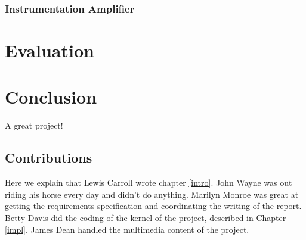 \documentclass{l3proj}
\begin{document}
\subsection{Instrumentation Amplifier}
\label{ina}


\chapter{Evaluation}

\chapter{Conclusion}

A great project!

\section{Contributions}

Here we explain that Lewis Carroll wrote chapter \ref{intro}. John Wayne
was out riding his horse every day and didn't do anything. Marilyn Monroe
was great at getting the requirements specification and coordinating the
writing of the report. Betty Davis did the coding of the kernel of the
project, described in Chapter \ref{impl}.  James Dean handled the
multimedia content of the project.



\end{document}

